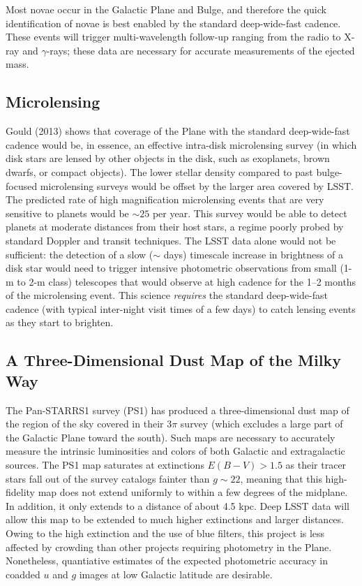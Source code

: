 Most novae occur in the Galactic Plane and Bulge, and therefore the quick
identification of novae is best enabled by the standard deep-wide-fast cadence.
These events will trigger multi-wavelength follow-up ranging from the radio to
X-ray and $\gamma$-rays; these data are necessary for accurate measurements of
the ejected mass.

\subsection{Microlensing}

Gould (2013) shows that coverage of the Plane with the standard deep-wide-fast
cadence would be, in essence, an effective intra-disk microlensing survey (in
which disk stars are lensed by other objects in the disk, such as exoplanets,
brown dwarfs, or compact objects). The lower stellar density compared to past
bulge-focused microlensing surveys would be offset by the larger area covered
by LSST. The predicted rate of high magnification microlensing events that are
very sensitive to planets would be $\sim 25$ per year. This survey would be
able to detect planets at moderate distances from their host stars, a regime
poorly probed by standard Doppler and transit techniques. The LSST data alone
would not be sufficient: the detection of a slow ($\sim$ days) timescale
increase in brightness of a disk star would need to trigger intensive
photometric observations from small (1-m to 2-m class) telescopes that would
observe at high cadence for the 1--2 months of the microlensing event. This
science \emph{requires} the standard deep-wide-fast cadence (with typical
inter-night visit times of a few days) to catch lensing events as they start to
brighten.


\subsection{A Three-Dimensional Dust Map of the Milky Way}

The Pan-STARRS1 survey (PS1) has produced a three-dimensional dust map of the
region of the sky covered in their 3$\pi$ survey (which excludes a large part
of the Galactic Plane toward the south). Such maps are necessary to accurately
measure the intrinsic luminosities and colors of both Galactic and
extragalactic sources. The PS1 map \citep{2011MNRAS.411.2695P} saturates at
extinctions $E(B-V) > 1.5$ as their tracer stars fall out of the survey
catalogs fainter than $g\sim 22$, meaning that this high-fidelity map does not
extend uniformly to within a few degrees of the midplane. In addition, it only
extends to a distance of about 4.5 kpc. Deep LSST data will allow this map to
be extended to much higher extinctions and larger distances. Owing to the high
extinction and the use of blue filters, this project is less affected by
crowding than other projects requiring photometry in the Plane. Nonetheless,
quantiative estimates of the expected photometric accuracy in coadded $u$ and
$g$ images at low Galactic latitude are desirable.


